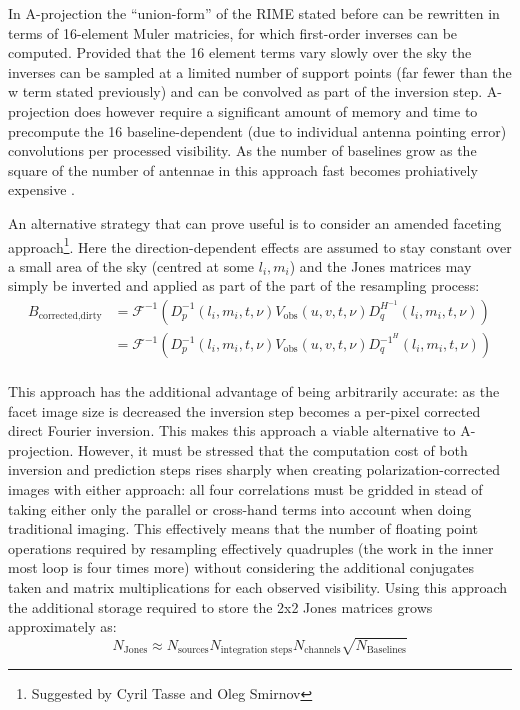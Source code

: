In A-projection the ``union-form'' of the RIME stated before can be rewritten in terms of 16-element Muler matricies, for which first-order 
inverses can be computed. Provided that the 16 element terms vary slowly over the sky the inverses can be sampled at a limited number
of support points (far fewer than the w term stated previously) and can be convolved as part of the inversion step. A-projection does 
however require a significant amount of memory and time to precompute the 16 baseline-dependent (due to individual antenna pointing error) 
convolutions per processed visibility. As the number of baselines grow as the square of the number of antennae in this approach fast 
becomes prohiatively expensive \cite{tasse2013applying}.

An alternative strategy that can prove useful is to consider an amended faceting approach\footnote{Suggested by Cyril Tasse and Oleg Smirnov}. Here the 
direction-dependent effects are assumed to stay constant over a small area of the sky (centred at some $l_i,m_i$) and the Jones 
matrices may simply be inverted and applied as part of the part of the resampling process:
\begin{equation*}
 \begin{split}
 B_{\text{corrected,dirty}} &= \mathcal{F}^{-1}(D_p^{-1}(l_i,m_i,t,\nu)V_{\text{obs}}(u,v,t,\nu)D_q^{H^{-1}}(l_i,m_i,t,\nu))\\
			    &= \mathcal{F}^{-1}(D_p^{-1}(l_i,m_i,t,\nu)V_{\text{obs}}(u,v,t,\nu)D_q^{{-1}^H}(l_i,m_i,t,\nu))\\
 \end{split}
\end{equation*}

This approach has the additional advantage of being arbitrarily accurate: as the facet image size is decreased the inversion step
becomes a per-pixel corrected direct Fourier inversion. This makes this approach a viable alternative to A-projection. However, 
it must be stressed that the computation cost of both inversion and prediction steps rises sharply when creating polarization-corrected 
images with either approach: all four correlations must be gridded in stead of taking either only the parallel or cross-hand terms into 
account when doing traditional imaging. This effectively means that the number of floating point operations required by resampling 
effectively quadruples (the work in the inner most loop is four times more) without considering the additional conjugates taken and 
matrix multiplications for each observed visibility. Using this approach the additional storage required to store the 2x2 Jones 
matrices grows approximately as:
\begin{equation*}
 N_{\text{Jones}} \approx N_{\text{sources}}N_{\text{integration steps}}N_{\text{channels}}\sqrt{N_{\text{Baselines}}}
\end{equation*}

